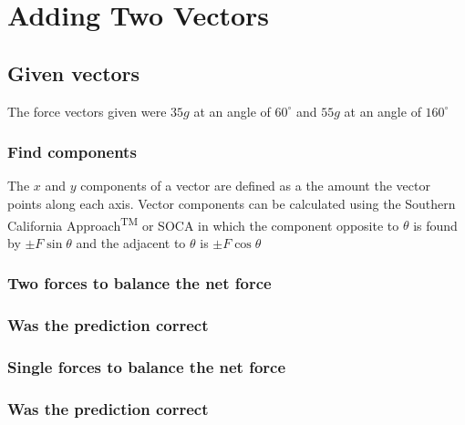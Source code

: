 \documentclass[11pt, letterpaper, includehead]{article}
\begin{document}
\tableofcontents
\pagebreak %

\pagestyle{fancy}
\fancyhead{}

\pagebreak 

\section{Adding Two Vectors} %

\subsection{Given vectors} %
The force vectors given were $35g$ at an angle of $60^{\circ}$ and $55g$ at an angle of $160^{\circ}$

\subsubsection{Find components} %
The $x$ and $y$ components of a vector are defined as a the amount the vector 
points along each axis. Vector components can be calculated using the Southern 
California Approach\textsuperscript{TM} or SOCA in which the component opposite to
$\theta$ is found by $\pm F \sin\theta$ and the adjacent to $\theta$ is $\pm F \cos\theta$

\subsubsection{Two forces to balance the net force} %

\subsubsection{Was the prediction correct} %

\subsubsection{Single forces to balance the net force} %

\subsubsection{Was the prediction correct} %
\end{document}
